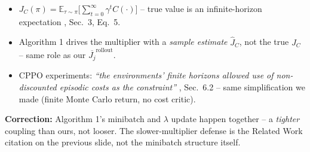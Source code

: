 \documentclass[aspectratio=169]{beamer}
\begin{document}
\begin{frame}
\begin{itemize}
  \item $J_C(\pi)=\mathbb{E}_{\tau\sim\pi}\bigl[\sum_{t=0}^{\infty}\gamma^t C(\cdot)\bigr]$ -- true value is an infinite-horizon expectation \cite{stooke20}, Sec.~3, Eq.~5.
  \item Algorithm 1 drives the multiplier with a \emph{sample estimate} $\hat J_C$, not the true $J_C$ -- same role as our $\overline{J_j}^{\text{rollout}}$.
  \item CPPO experiments: \emph{``the environments' finite horizons allowed use of non-discounted episodic costs as the constraint''} \cite{stooke20}, Sec.~6.2 -- same simplification we made (finite Monte Carlo return, no cost critic).
\end{itemize}
\vspace{6pt}
\footnotesize\textbf{Correction:} Algorithm 1's minibatch and $\lambda$ update happen together -- a \emph{tighter} coupling than ours, not looser. The slower-multiplier defense is the Related Work citation on the previous slide, not the minibatch structure itself.
\end{frame}
\end{document}
